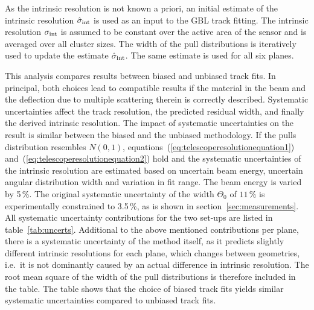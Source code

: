 As the intrinsic resolution is not known a priori, an initial estimate of the intrinsic resolution $\hat{\sigma}_{\textrm{int}}$ is used as an input to the GBL track fitting. 
The intrinsic resolution $\sigma_{\textrm{int}}$ is assumed to be constant over the active area of the sensor and is averaged over all cluster sizes. 
The width of the pull distributions is iteratively used to update the estimate $\hat{\sigma}_{\textrm{int}}$. 
The same estimate is used for all six planes. 

This analysis compares results between biased and unbiased track fits. 
In principal, both choices lead to compatible results if the material in the beam and the deflection due to multiple scattering therein is correctly described. 
Systematic uncertainties affect the track resolution, the predicted residual width, and finally the derived intrinsic resolution. 
The impact of systematic uncertainties on the result is similar between the biased and the unbiased methodology. 
If the pulls distribution resembles $N(0,1)$, equations~(\ref{eq:telescoperesolutionequation1}) and~(\ref{eq:telescoperesolutionequation2}) hold and the systematic uncertainties of the intrinsic resolution
 are estimated based on uncertain beam energy, uncertain angular distribution width and variation in fit range. 
The beam energy is varied by 5\,\%. 
The original systematic uncertainty of the width $\Theta_{0}$ of $11\,\%$ is experimentally constrained to 3.5\,\%, as is shown in section~\ref{sec:measurements}. 
All systematic uncertainty contributions for the two set-ups are listed in table~\ref{tab:uncerts}. 
Additional to the above mentioned contributions per plane,
 there is a systematic uncertainty of the method itself, as it predicts slightly different intrinsic resolutions for each plane, which changes between geometries,
 i.e.\ it is not dominantly caused by an actual difference in intrinsic resolution. 
The root mean square of the width of the pull distributions is therefore included in the table. %
The table shows that the choice of biased track fits yields similar systematic uncertainties compared to unbiased track fits. 


